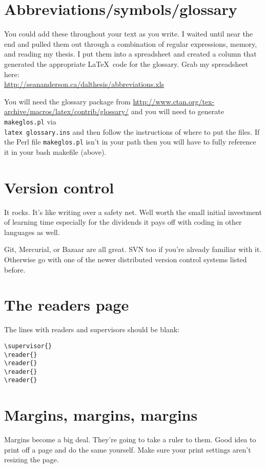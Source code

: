 \documentclass[12pt]{article}
\begin{document}
\section{Abbreviations/symbols/glossary}
You could add these throughout your text as you write. I waited until near the end and pulled them out through a combination of regular expressions, memory, and reading my thesis. I put them into a spreadsheet and created a column that generated the appropriate \LaTeX\ code for the glossary. Grab my spreadsheet here:\\
\url{http://seananderson.ca/dalthesis/abbreviations.xls}

You will need the glossary package from \url{http://www.ctan.org/tex-archive/macros/latex/contrib/glossary/} and you will need to generate \verb#makeglos.pl# via\\ \verb#latex glossary.ins# and then follow the instructions of where to put the files. If the Perl file \verb#makeglos.pl# isn't in your path then you will have to fully reference it in your bash makefile (above).

\section{Version control}
It rocks. It's like writing over a safety net. Well worth the small initial investment of learning time especially for the dividends it pays off with coding in other languages as well.

Git, Mercurial, or Bazaar are all great. SVN too if you're already familiar with it. Otherwise go with one of the newer distributed version control systems listed before.

\section{The readers page}
The lines with readers and supervisors should be blank:
\begin{verbatim}
\supervisor{}
\reader{}
\reader{}
\reader{}
\reader{}
\end{verbatim}

\section{Margins, margins, margins}
Margins become a big deal. They're going to take a ruler to them. Good idea to print off a page and do the same yourself. Make sure your print settings aren't resizing the page.
\end{document}
